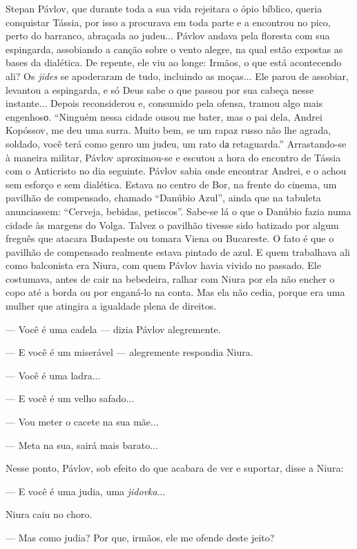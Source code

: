 Stepan Pávlov, que durante toda a sua vida rejeitara o ópio bíblico,
queria conquistar Tássia, por isso a procurava em toda parte e a
encontrou no pico, perto do barranco, abraçada ao judeu... Pávlov andava
pela floresta com sua espingarda, assobiando a canção sobre o vento
alegre, na qual estão expostas as bases da dialética. De repente, ele
viu ao longe: Irmãos, o que está acontecendo ali? Os \emph{jides} se
apoderaram de tudo, incluindo as moças... Ele parou de assobiar,
levantou a espingarda, e só Deus sabe o que passou por sua cabeça nesse
instante... Depois reconsiderou e, consumido pela ofensa, tramou algo
mais engenhosо. ``Ninguém nessa cidade ousou me bater, mas o pai dela,
Andrei Kopóssov, me deu uma surra. Muito bem, se um rapaz russo não lhe
agrada, soldado, você terá como genro um judeu, um rato dа retaguarda.''
Arrastando-se à maneira militar, Pávlov aproximou-se e escutou a hora do
encontro de Tássia com o Anticristo no dia seguinte. Pávlov sabia onde
encontrar Andrei, e o achou sem esforço e sem dialética. Estava no
centro de Bor, na frente do cinema, um pavilhão de compensado, chamado
``Danúbio Azul'', ainda que na tabuleta anunciassem: ``Cerveja, bebidas,
petiscos''. Sabe-se lá o que o Danúbio fazia numa cidade às margens do
Volga. Talvez o pavilhão tivesse sido batizado por algum freguês que
atacara Budapeste ou tomara Viena ou Bucareste. O fato é que o pavilhão
de compensado realmente estava pintado de azul. E quem trabalhava ali
como balconista era Niura, com quem Pávlov havia vivido no passado. Ele
costumava, antes de cair na bebedeira, ralhar com Niura por ela não
encher o copo até a borda ou por enganá-lo na conta. Mas ela não cedia,
porque era uma mulher que atingira a igualdade plena de direitos.

--- Você é uma cadela --- dizia Pávlov alegremente.

--- E você é um miserável --- alegremente respondia Niura.

--- Você é uma ladra...

--- E você é um velho safado...

--- Vou meter o cacete na sua mãe...

--- Meta na sua, sairá mais barato...

Nesse ponto, Pávlov, sob efeito do que acabara de ver e suportar, disse
a Niura:

--- E você é uma judia, uma \emph{jidovka}...

Niura caiu no choro.

--- Mas como judia? Por que, irmãos, ele me ofende deste jeito?

